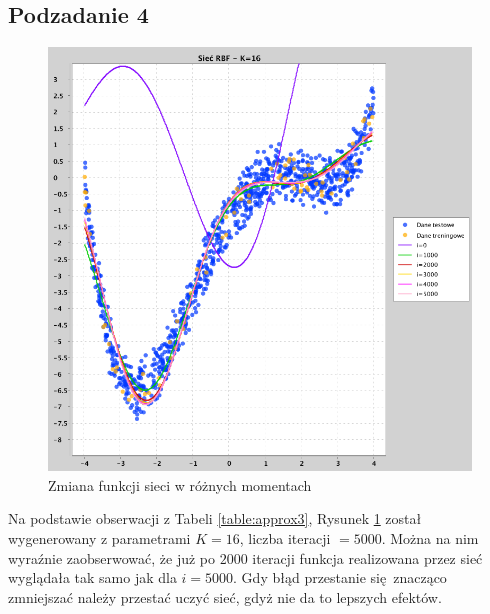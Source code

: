 \documentclass[a4paper, portrait,11pt]{article}
\begin{document}
\subsection{Podzadanie 4}
\begin{figure}[!htb]
  \centering
  \begin{minipage}{0.5\textwidth}
    \includegraphics[width=1\linewidth]{../data/approximation3/4/chart.png}
    \caption{\label{fig:4chart}Zmiana funkcji sieci w różnych momentach}
  \end{minipage}\hfill
\end{figure}

Na podstawie obserwacji z Tabeli \ref{table:approx3},
Rysunek \ref{fig:4chart} został wygenerowany z parametrami $K=16$, liczba iteracji $= 5000$.
Można na nim wyraźnie zaobserwować, że już po $2000$ iteracji funkcja realizowana przez sieć wyglądała tak samo jak dla $i=5000$.
Gdy błąd przestanie się znacząco zmniejszać należy przestać uczyć sieć, gdyż nie da to lepszych efektów.
\end{document}

